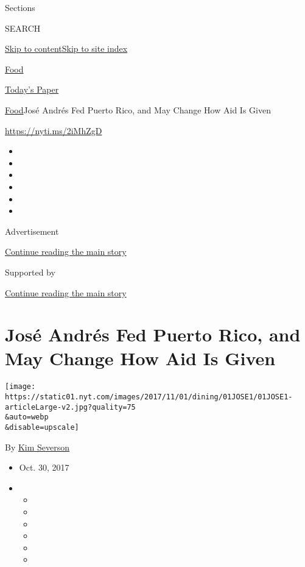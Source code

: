 Sections

SEARCH

\protect\hyperlink{site-content}{Skip to
content}\protect\hyperlink{site-index}{Skip to site index}

\href{https://www.nytimes.com/section/food}{Food}

\href{https://myaccount.nytimes.com/auth/login?response_type=cookie\&client_id=vi}{}

\href{https://www.nytimes.com/section/todayspaper}{Today's Paper}

\href{/section/food}{Food}\textbar{}José Andrés Fed Puerto Rico, and May
Change How Aid Is Given

\url{https://nyti.ms/2iMhZgD}

\begin{itemize}
\item
\item
\item
\item
\item
\item
\end{itemize}

Advertisement

\protect\hyperlink{after-top}{Continue reading the main story}

Supported by

\protect\hyperlink{after-sponsor}{Continue reading the main story}

\hypertarget{josuxe9-andruxe9s-fed-puerto-rico-and-may-change-how-aid-is-given}{%
\section{José Andrés Fed Puerto Rico, and May Change How Aid Is
Given}\label{josuxe9-andruxe9s-fed-puerto-rico-and-may-change-how-aid-is-given}}

\texttt{[image: https://static01.nyt.com/images/2017/11/01/dining/01JOSE1/01JOSE1-articleLarge-v2.jpg?quality=75\\\&auto=webp\\\&disable=upscale]}

By \href{http://www.nytimes.com/by/kim-severson}{Kim Severson}

\begin{itemize}
\item
  Oct. 30, 2017
\item
  \begin{itemize}
  \item
  \item
  \item
  \item
  \item
  \item
  \end{itemize}
\end{itemize}

